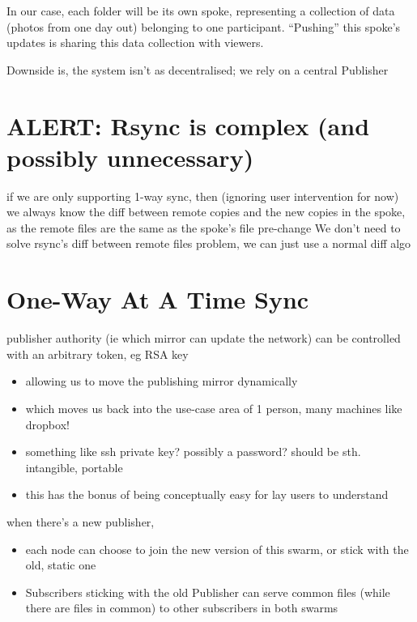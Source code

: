 \documentclass[12pt,a4paper,]{adreport}
\begin{document}
In our case, each folder will be its own spoke, representing a
collection of data (photos from one day out) belonging to one
participant. ``Pushing'' this spoke's updates is sharing this data
collection with viewers.

Downside is, the system isn't as decentralised; we rely on a central
Publisher

\section{ALERT: Rsync is complex (and possibly
unnecessary)}\label{alert-rsync-is-complex-and-possibly-unnecessary}

if we are only supporting 1-way sync, then (ignoring user intervention
for now) we always know the diff between remote copies and the new
copies in the spoke, as the remote files are the same as the spoke's
file pre-change We don't need to solve rsync's diff between remote files
problem, we can just use a normal diff algo

\section{One-Way At A Time Sync}\label{one-way-at-a-time-sync}

publisher authority (ie which mirror can update the network) can be
controlled with an arbitrary token, eg RSA key

\begin{itemize}
\itemsep1pt\parskip0pt
\item
  allowing us to move the publishing mirror dynamically
\item
  which moves us back into the use-case area of 1 person, many machines
  like dropbox!
\item
  something like ssh private key? possibly a password? should be sth.
  intangible, portable
\item
  this has the bonus of being conceptually easy for lay users to
  understand
\end{itemize}

when there's a new publisher,

\begin{itemize}
\itemsep1pt\parskip0pt
\item
  each node can choose to join the new version of this swarm, or stick
  with the old, static one
\item
  Subscribers sticking with the old Publisher can serve common files
  (while there are files in common) to other subscribers in both swarms
\end{itemize}
\end{document}
